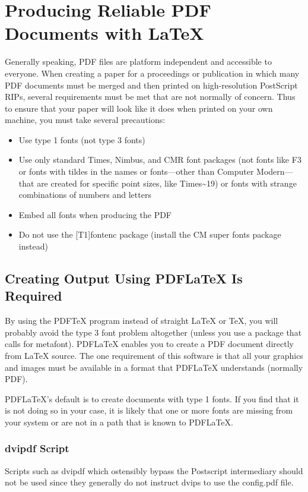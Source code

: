 \documentclass[letterpaper]{article}
\begin{document}
\section{Producing Reliable PDF\\Documents with \LaTeX{}}
Generally speaking, PDF files are platform independent and accessible to everyone. When creating a paper for a proceedings or publication in which many PDF documents must be merged and then printed on high-resolution PostScript RIPs, several requirements must be met that are not normally of concern. Thus to ensure that your paper will look like it does when printed on your own machine, you must take several precautions:
\begin{itemize}
\item Use type 1 fonts (not type 3 fonts)
\item Use only standard Times, Nimbus, and CMR font packages (not fonts like F3 or fonts with tildes in the names or fonts---other than Computer Modern---that are created for specific point sizes, like Times\~{}19) or fonts with strange combinations of numbers and letters
\item Embed all fonts when producing the PDF
\item Do not use the [T1]{fontenc} package (install the CM super fonts package instead)
\end{itemize}

\subsection{Creating Output Using PDF\LaTeX{} Is Required}
By using the PDF\TeX{} program instead of straight \LaTeX{} or \TeX{}, you will probably avoid the type 3 font problem altogether (unless you use a package that calls for metafont). PDF\LaTeX{} enables you to create a PDF document directly from \LaTeX{} source. The one requirement of this software is that all your graphics and images must be available in a format that PDF\LaTeX{} understands (normally PDF).

PDF\LaTeX{}'s default is to create documents with type 1 fonts. If you find that it is not doing so in your case, it is likely that one or more fonts are missing from your system or are not in a path that is known to PDF\LaTeX{}.

\subsubsection{dvipdf Script}
Scripts such as dvipdf which ostensibly bypass the Postscript intermediary should not be used since they generally do not instruct dvips to use the config.pdf file.
\end{document}
